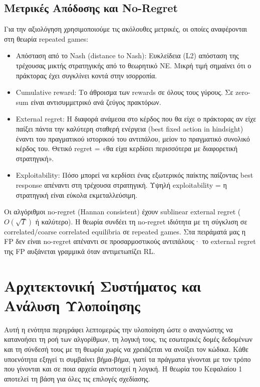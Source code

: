\documentclass[11pt,a4paper]{article}
\begin{document}
\subsection{Μετρικές Απόδοσης και No-Regret}

Για την αξιολόγηση χρησιμοποιούμε τις ακόλουθες μετρικές, οι οποίες αναφέρονται στη θεωρία repeated games:

\begin{itemize}
\item Απόσταση από το Nash (distance to Nash): Ευκλείδεια (L2) απόσταση της τρέχουσας μικτής στρατηγικής από το θεωρητικό NE. Μικρή τιμή σημαίνει ότι ο πράκτορας έχει συγκλίνει κοντά στην ισορροπία.

\item Cumulative reward: Το άθροισμα των rewards σε όλους τους γύρους. Σε zero-sum είναι αντισυμμετρικό ανά ζεύγος πρακτόρων.

\item External regret: Η διαφορά ανάμεσα στο κέρδος που θα είχε ο πράκτορας αν είχε παίξει πάντα την καλύτερη σταθερή ενέργεια (best fixed action in hindsight) έναντι του πραγματικού ιστορικού του αντιπάλου, μείον το πραγματικό συνολικό κέρδος του. Θετικό regret = «θα είχα κερδίσει περισσότερα με διαφορετική στρατηγική».

\item Exploitability: Πόσο μπορεί να κερδίσει ένας εξωτερικός παίκτης παίζοντας best response απέναντι στη τρέχουσα στρατηγική. Υψηλή exploitability = η στρατηγική είναι εύκολα εκμεταλλεύσιμη.
\end{itemize}

Οι αλγόριθμοι no-regret (Hannan consistent) έχουν sublinear external regret (\(O(\sqrt{T})\) ή καλύτερο). Η θεωρία συνδέει τη no-regret ιδιότητα με τη σύγκλιση σε correlated/coarse correlated equilibria σε repeated games. Στα πειράματά μας η FP δεν είναι no-regret απέναντι σε προσαρμοστικούς αντιπάλους· το external regret της FP αυξάνεται γραμμικά όταν αντιμετωπίζει RL.

\section{Αρχιτεκτονική Συστήματος και Ανάλυση Υλοποίησης}

Αυτή η ενότητα περιγράφει λεπτομερώς την υλοποίηση ώστε ο αναγνώστης να κατανοήσει τη ροή των αλγορίθμων, τη λογική τους, τις εσωτερικές δομές δεδομένων και τη σύνδεσή τους με τη θεωρία χωρίς να χρειάζεται να ανοίξει τον κώδικα. Κάθε υποενότητα εξηγεί τι συμβαίνει βήμα-βήμα, γιατί τα πράγματα γίνονται με τον τρόπο που γίνονται και σε ποια αρχεία αντιστοιχεί η λογική. Η θεωρία του Κεφαλαίου 1 αποτελεί τη βάση για όλες τις επιλογές σχεδίασης.
\end{document}
